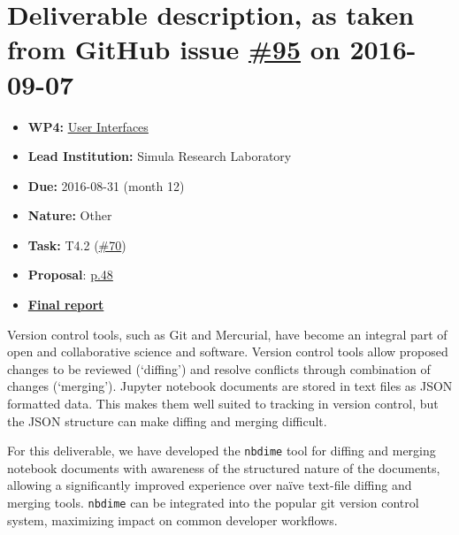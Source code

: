 \section*{\texorpdfstring{Deliverable description, as taken from GitHub
issue
\href{https://github.com/OpenDreamKit/OpenDreamKit/issues/95}{\#95} on
2016-09-07}{Deliverable description, as taken from GitHub issue \#95 on 2016-09-07}}\label{deliverable-description-as-taken-from-github-issues-95-on-2016-09-07}

\begin{itemize}
\tightlist
\item
  \textbf{WP4:}
  \href{https://github.com/OpenDreamKit/OpenDreamKit/tree/master/WP4}{User
  Interfaces}
\item
  \textbf{Lead Institution:} Simula Research Laboratory
\item
  \textbf{Due:} 2016-08-31 (month 12)
\item
  \textbf{Nature:} Other
\item
  \textbf{Task:} T4.2
  (\href{https://github.com/OpenDreamKit/OpenDreamKit/issues/70}{\#70})
\item
  \textbf{Proposal}:
  \href{https://github.com/OpenDreamKit/OpenDreamKit/raw/master/Proposal/proposal-www.pdf}{p.48}
\item
  \textbf{\href{https://github.com/OpenDreamKit/OpenDreamKit/raw/master/WP4/D4.6/report-final.pdf}{Final
  report}}
\end{itemize}

Version control tools, such as Git and Mercurial, have become an
integral part of open and collaborative science and software. Version
control tools allow proposed changes to be reviewed (`diffing') and
resolve conflicts through combination of changes (`merging'). Jupyter
notebook documents are stored in text files as JSON formatted data. This
makes them well suited to tracking in version control, but the JSON
structure can make diffing and merging difficult.

For this deliverable, we have developed the \texttt{nbdime} tool for
diffing and merging notebook documents with awareness of the structured
nature of the documents, allowing a significantly improved experience
over naïve text-file diffing and merging tools. \texttt{nbdime} can be
integrated into the popular git version control system, maximizing
impact on common developer workflows.
